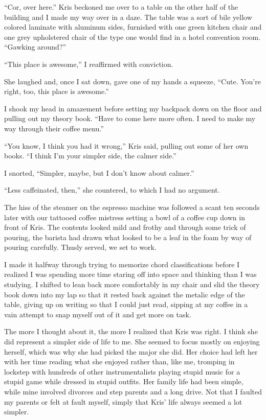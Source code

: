 ``Cor, over here.''  Kris beckoned me over to a table on the other half of the building and I made my way over in a daze.  The table was a sort of bile yellow colored laminate with aluminum sides, furnished with one green kitchen chair and one grey upholstered chair of the type one would find in a hotel convention room.  ``Gawking around?''

``This place is awesome,'' I reaffirmed with conviction.

She laughed and, once I sat down, gave one of my hands a squeeze, ``Cute.  You're right, too, this place is awesome.''

I shook my head in amazement before setting my backpack down on the floor and pulling out my theory book.  ``Have to come here more often.  I need to make my way through their coffee menu.''

``You know, I think you had it wrong,'' Kris said, pulling out some of her own books.  ``I think I'm your simpler side, the calmer side.''

I snorted, ``Simpler, maybe, but I don't know about calmer.''

``Less caffeinated, then,'' she countered, to which I had no argument.

The hiss of the steamer on the espresso machine was followed a scant ten seconds later with our tattooed coffee mistress setting a bowl of a coffee cup down in front of Kris.  The contents looked mild and frothy and through some trick of pouring, the barista had drawn what looked to be a leaf in the foam by way of pouring carefully.  Thusly served, we set to work.

I made it halfway through trying to memorize chord classifications before I realized I was spending more time staring off into space and thinking than I was studying.  I shifted to lean back more comfortably in my chair and slid the theory book down into my lap so that it rested back against the metalic edge of the table, giving up on writing so that I could just read, sipping at my coffee in a vain attempt to snap myself out of it and get more on task.

The more I thought about it, the more I realized that Kris was right.  I think she did represent a simpler side of life to me.  She seemed to focus mostly on enjoying herself, which was why she had picked the major she did.  Her choice had left her with her time reading what she enjoyed rather than, like me, tromping in lockstep with hundreds of other instrumentalists playing stupid music for a stupid game while dressed in stupid outfits.  Her family life had been simple, while mine involved divorces and step parents and a long drive.  Not that I faulted my parents or felt at fault myself, simply that Kris' life always seemed a lot simpler.

